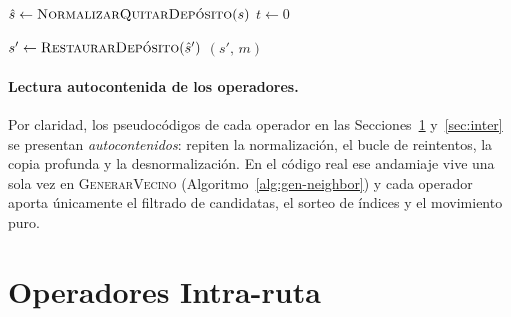 \documentclass[12pt, a4paper]{article}
\begin{document}
\begin{algorithm}[H]
\DontPrintSemicolon
\caption{\textsc{GenerarVecino} — Rutina maestra de generación de vecinos}
\label{alg:gen-neighbor}


\BlankLine
$\hat{s} \leftarrow \textsc{NormalizarQuitarDepósito}(s)$
$t \leftarrow 0$ \;


$s' \leftarrow \textsc{RestaurarDepósito}(\hat{s}')$
\Return $(s',\, m)$
\end{algorithm}

\paragraph{Lectura autocontenida de los operadores.}
Por claridad, los pseudocódigos de cada operador en las
Secciones~\ref{sec:intra} y~\ref{sec:inter} se presentan
\emph{autocontenidos}: repiten la normalización, el bucle de reintentos, la
copia profunda y la desnormalización.  En el código real ese andamiaje vive
una sola vez en \textsc{GenerarVecino} (Algoritmo~\ref{alg:gen-neighbor}) y
cada operador aporta únicamente el filtrado de candidatas, el sorteo de
índices y el movimiento puro.

\section{Operadores Intra-ruta}
\label{sec:intra}
\end{document}
